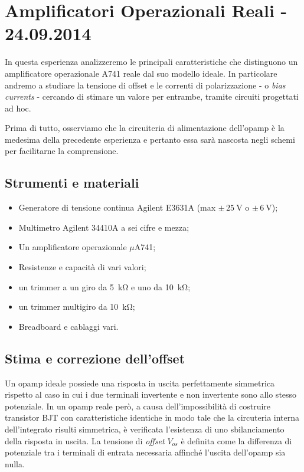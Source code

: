 \section{Amplificatori Operazionali Reali - 24.09.2014}

In questa esperienza analizzeremo le principali caratteristiche che distinguono un amplificatore operazionale \si{\micro}A741 reale dal suo modello ideale.
In particolare andremo a studiare la tensione di offset e le correnti di polarizzazione - o \textit{bias currents} - cercando di stimare un valore per entrambe, tramite circuiti progettati ad hoc.

Prima di tutto, osserviamo che la circuiteria di alimentazione dell'opamp è la medesima della precedente esperienza e pertanto essa sarà nascosta negli schemi per facilitarne la comprensione.

\subsection*{Strumenti e materiali}

\begin{itemize} [noitemsep]
\item Generatore di tensione continua Agilent E3631A (max $\pm \, \SI{25}{\volt}$ o $\pm \, \SI{6}{\volt}$);
\item Multimetro Agilent 34410A a sei cifre e mezza;
\item Un amplificatore operazionale $\mu$A741;
\item Resistenze e capacità di vari valori;
\item un trimmer a un giro da \SI{5}{\kilo\ohm} e uno da \SI{10}{\kilo\ohm};
\item un trimmer multigiro da \SI{10}{\kilo\ohm};
\item Breadboard e cablaggi vari.
\end{itemize}

\subsection{Stima e correzione dell'offset}
\label{par2:offset}

Un opamp ideale possiede una risposta in uscita perfettamente simmetrica rispetto al caso in cui i due terminali invertente e non invertente sono allo stesso potenziale.
In un opamp reale però, a causa dell'impossibilità di costruire transistor BJT con caratteristiche identiche in modo tale che la circuteria interna dell'integrato risulti simmetrica, è verificata l'esistenza di uno sbilanciamento della risposta in uscita.
La tensione di \textit{offset} $V_{os}$ è definita come la differenza di potenziale tra i terminali di entrata necessaria affinché l'uscita dell'opamp sia nulla.

